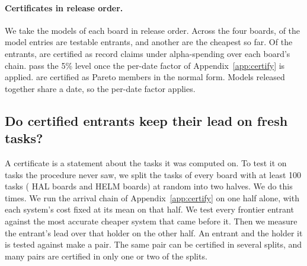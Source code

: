 \documentclass[11pt]{article}
\begin{document}
\paragraph{Certificates in release order.}
We take the models of each board in release order. Across the four boards, \NumHelmCertEntrants{} of the \NumHelmCertSystems{} model entries are testable entrants, and another \NumHelmCertCheapest{} are the cheapest so far. Of the entrants, \NumHelmCertSpending{} are certified as record claims under alpha-spending over each board's chain. \NumHelmCertUnadjusted{} pass the 5\% level once the per-date factor of Appendix~\ref{app:certify} is applied. \NumHelmCertIUSpending{} are certified as Pareto members in the normal form. Models released together share a date, so the per-date factor applies.

\subsection{Do certified entrants keep their lead on fresh tasks?}
\label{sec:replication}
A certificate is a statement about the tasks it was computed on. To test it on tasks the procedure never saw, we split the tasks of every board with at least 100 tasks (\NumReplHalBoardsTested{} HAL boards and \NumReplHelmBoardsTested{} HELM boards) at random into two halves. We do this \NumReplHalR{} times. We run the arrival chain of Appendix~\ref{app:certify} on one half alone, with each system's cost fixed at its mean on that half. We test every frontier entrant against the most accurate cheaper system that came before it. Then we measure the entrant's lead over that holder on the other half. An entrant and the holder it is tested against make a pair. The same pair can be certified in several splits, and many pairs are certified in only one or two of the splits.
\end{document}
